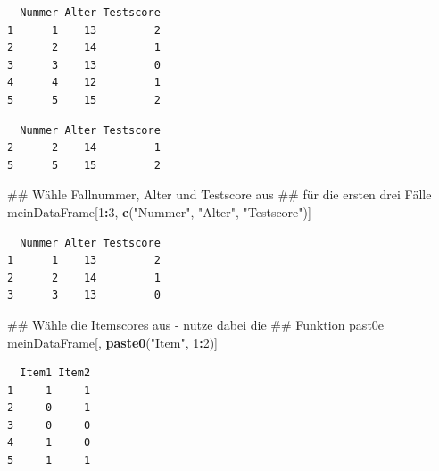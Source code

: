 \documentclass[12pt,]{tufte-book}
\newenvironment{Shaded}{\begin{snugshade}}{\end{snugshade}}
\newcommand{\KeywordTok}[1]{\textcolor[rgb]{0.13,0.29,0.53}{\textbf{#1}}}
\newcommand{\DecValTok}[1]{\textcolor[rgb]{0.00,0.00,0.81}{#1}}
\newcommand{\StringTok}[1]{\textcolor[rgb]{0.31,0.60,0.02}{#1}}
\newcommand{\OperatorTok}[1]{\textcolor[rgb]{0.81,0.36,0.00}{\textbf{#1}}}
\newcommand{\NormalTok}[1]{#1}
\theoremstyle{definition}
\theoremstyle{definition}
\theoremstyle{definition}
\theoremstyle{remark}
\begin{document}
\begin{verbatim}
  Nummer Alter Testscore
1      1    13         2
2      2    14         1
3      3    13         0
4      4    12         1
5      5    15         2
\end{verbatim}

\begin{Shaded}
\end{Shaded}

\begin{verbatim}
  Nummer Alter Testscore
2      2    14         1
5      5    15         2
\end{verbatim}

\begin{Shaded}
\begin{Highlighting}[]
\NormalTok{## Wähle Fallnummer, Alter und Testscore aus}
\NormalTok{## für die ersten drei Fälle}
\NormalTok{meinDataFrame[}\DecValTok{1}\OperatorTok{:}\DecValTok{3}\NormalTok{, }\KeywordTok{c}\NormalTok{(}\StringTok{"Nummer"}\NormalTok{, }\StringTok{"Alter"}\NormalTok{, }\StringTok{"Testscore"}\NormalTok{)]}
\end{Highlighting}
\end{Shaded}

\begin{verbatim}
  Nummer Alter Testscore
1      1    13         2
2      2    14         1
3      3    13         0
\end{verbatim}

\begin{Shaded}
\begin{Highlighting}[]
\NormalTok{## Wähle die Itemscores aus - nutze dabei die}
\NormalTok{## Funktion past0e}
\NormalTok{meinDataFrame[, }\KeywordTok{paste0}\NormalTok{(}\StringTok{"Item"}\NormalTok{, }\DecValTok{1}\OperatorTok{:}\DecValTok{2}\NormalTok{)]}
\end{Highlighting}
\end{Shaded}

\begin{verbatim}
  Item1 Item2
1     1     1
2     0     1
3     0     0
4     1     0
5     1     1
\end{verbatim}
\end{document}

